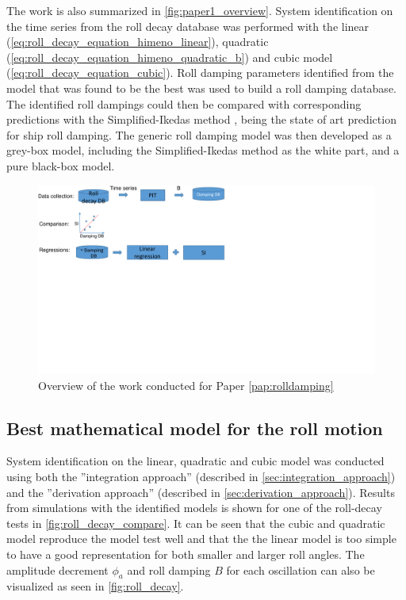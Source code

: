 \noindent The work is also summarized in \autoref{fig:paper1_overview}. System identification on the time series from the roll decay database was performed with the linear (\autoref{eq:roll_decay_equation_himeno_linear}), quadratic (\autoref{eq:roll_decay_equation_himeno_quadratic_b}) and cubic model (\autoref{eq:roll_decay_equation_cubic}). Roll damping parameters identified from the model that was found to be the best was used to build a roll damping database. The identified roll dampings could then be compared with corresponding predictions with the Simplified-Ikedas method \cite{kawahara_simple_2011}, being the state of art prediction for ship roll damping.
The generic roll damping model was then developed as a grey-box model, including the Simplified-Ikedas method as the white part, and a pure black-box model.
\begin{figure}[H]
    \centering
    \includegraphics[width=\linewidth]{kappa/images/workflow.pdf}
    \caption{Overview of the work conducted for Paper \ref{pap:rolldamping}}
    \label{fig:paper1_overview}
\end{figure}

\subsection{Best mathematical model for the roll motion}
System identification on the linear, quadratic and cubic model was conducted using both the ''integration approach'' (described in \autoref{sec:integration_approach}) and the ''derivation approach'' (described in \autoref{sec:derivation_approach}).
Results from simulations with the identified models is shown for one of the roll-decay tests in \autoref{fig:roll_decay_compare}. It can be seen that the cubic and quadratic model reproduce the model test well and that the the linear model is too simple to have a good representation for both smaller and larger roll angles. The amplitude decrement $\phi_a$ and roll damping $B$ for each oscillation can also be visualized as seen in \autoref{fig:roll_decay}.

